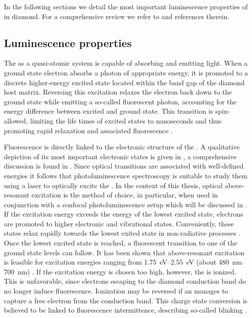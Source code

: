   In the following sections we detail the most important luminescence properties of \sivs in diamond. For a comprehensive review we refer to \cite{Riedrich-moller2014, Neu2012} and references therein.


  \subsection{Luminescence properties}

    The \sivc as a quasi-atomic system is capable of absorbing and emitting light. When a ground state electron absorbs a photon of appropriate energy, it is promoted to a discrete higher-energy excited state located within the band gap of the diamond host matrix. Reversing this excitation relaxes the electron back down to the ground state while emitting a so-called fluorescent photon, accounting for the energy difference between excited and ground state. This transition is spin-allowed, limiting the life times of excited states to nanoseconds and thus promoting rapid relaxation and associated fluorescence \cite{Gali2013}.

    Fluorescence is directly linked to the electronic structure of the \siv. A qualitative depiction of its most important electronic states is given in , a comprehensive discussion is found in \cite{Gali2013, Hepp2014dissertation, Becker2014dissertation}.
    Since optical transitions are associated with well-defined energies it follows that photoluminescence spectroscopy is suitable to study them using a laser to optically excite the \siv. In the context of this thesis, optical above-resonant excitation is the method of choice, in particular, when used in conjunction with a confocal photoluminescence setup which will be discussed in .
    If the excitation energy exceeds the energy of the lowest excited state, electrons are promoted to higher electronic and vibrational states. Conveniently, these states relax rapidly towards the lowest exited state in non-radiative processes \cite{Gali2013}. Once the lowest excited state is reached, a fluorescent transition to one of the ground state levels can follow. It has been shown that above-resonant excitation is feasible for excitation energies ranging from \SIrange{1.75}{2.55}{\eV} (about \SIrange{480}{700}{\nm}) \cite{iakoubovskii2001optical, Iakoubovskii2000, Rossi1997}. If the excitation energy is chosen too high, however, the \siv is ionized. This is unfavorable, since electrons escaping to the diamond conduction band do no longer induce fluorescence. Ionization may be reversed if an \siv manages to capture a free electron from the conduction band. This charge state conversion is believed to be linked to fluorescence intermittence, describing so-called blinking \sivs \cite{Muller2011, Siyushev2009}.

